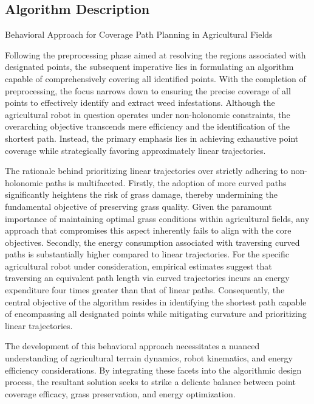 
\subsection{Algorithm Description}

Behavioral Approach for Coverage Path Planning in Agricultural Fields

\vspace*{6mm}  

Following the preprocessing phase aimed at resolving the regions associated with designated points, the subsequent imperative lies in formulating an algorithm capable of comprehensively covering all identified points. With the completion of preprocessing, the focus narrows down to ensuring the precise coverage of all points to effectively identify and extract weed infestations. Although the agricultural robot in question operates under non-holonomic constraints, the overarching objective transcends mere efficiency and the identification of the shortest path. Instead, the primary emphasis lies in achieving exhaustive point coverage while strategically favoring approximately linear trajectories.

\vspace*{6mm}   

The rationale behind prioritizing linear trajectories over strictly adhering to non-holonomic paths is multifaceted. Firstly, the adoption of more curved paths significantly heightens the risk of grass damage, thereby undermining the fundamental objective of preserving grass quality. Given the paramount importance of maintaining optimal grass conditions within agricultural fields, any approach that compromises this aspect inherently fails to align with the core objectives. Secondly, the energy consumption associated with traversing curved paths is substantially higher compared to linear trajectories. For the specific agricultural robot under consideration, empirical estimates suggest that traversing an equivalent path length via curved trajectories incurs an energy expenditure four times greater than that of linear paths. Consequently, the central objective of the algorithm resides in identifying the shortest path capable of encompassing all designated points while mitigating curvature and prioritizing linear trajectories.

\vspace*{6mm}  

The development of this behavioral approach necessitates a nuanced understanding of agricultural terrain dynamics, robot kinematics, and energy efficiency considerations. By integrating these facets into the algorithmic design process, the resultant solution seeks to strike a delicate balance between point coverage efficacy, grass preservation, and energy optimization.


